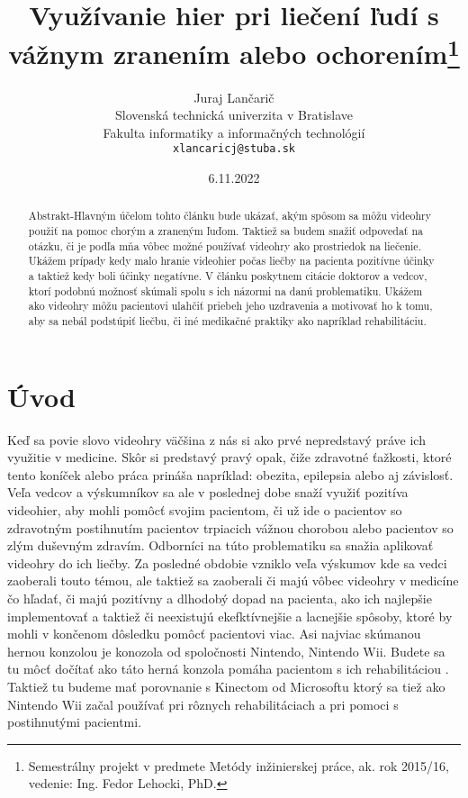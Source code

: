 \documentclass{article}
\title{Využívanie hier pri liečení ľudí s vážnym zranením
alebo ochorením\thanks{Semestrálny projekt v predmete Metódy inžinierskej práce, ak. rok 2015/16, vedenie: Ing. Fedor Lehocki, PhD.}} %
\author{Juraj Lančarič \\[2pt]
	{\small Slovenská technická univerzita v Bratislave}\\
	{\small Fakulta informatiky a informačných technológií}\\
	{\small \texttt{xlancaricj@stuba.sk}}
	}
\date{\small 6.11.2022} %
\begin{document}
\maketitle

\begin{abstract}
Abstrakt-Hlavným účelom tohto článku bude ukázať, akým spôsom sa môžu videohry použiť na pomoc chorým a zraneným ľuďom. Taktiež sa budem snažiť odpovedať na otázku, či je podľa mňa vôbec možné používať videohry ako prostriedok na liečenie. Ukážem prípady kedy malo hranie videohier počas liečby na pacienta pozitívne účinky a taktiež kedy boli účinky negatívne. V článku poskytnem citácie doktorov a vedcov, ktorí podobnú možnosť skúmali spolu s ich názormi na danú problematiku. Ukážem ako videohry môžu pacientovi ulahčiť priebeh jeho uzdravenia a motivovať ho k tomu, aby sa nebál podstúpiť liečbu, či iné medikačné praktiky ako napríklad rehabilitáciu.
\end{abstract}



\section{Úvod}
Keď sa povie slovo videohry väčšina z nás si ako prvé nepredstavý práve ich využitie v medicine. Skôr si predstavý pravý opak, čiže zdravotné ťažkosti, ktoré tento koníček alebo práca prináša napríklad: obezita, epilepsia alebo aj závislosť. Veľa vedcov a výskumníkov sa ale v poslednej dobe snaží využiť pozitíva videohier, aby mohli pomôcť svojim pacientom, či už ide o pacientov so zdravotným postihnutím pacientov trpiacich vážnou chorobou alebo pacientov so zlým duševným zdravím. Odborníci na túto problematiku sa snažia aplikovať videohry do ich liečby. 
Za posledné obdobie vzniklo veľa výskumov kde sa vedci zaoberali touto témou, ale taktiež sa zaoberali či majú vôbec videohry v medicíne čo hľadať, či majú pozitívny a dlhodobý dopad na pacienta, ako ich najlepšie implementovať a taktiež či neexistujú ekefktívnejšie a lacnejšie spôsoby, ktoré by mohli v končenom dôsledku pomôcť pacientovi viac.
Asi najviac skúmanou hernou konzolou je konozola od spoločnosti Nintendo, Nintendo Wii. Budete sa tu môcť dočítať ako táto herná konzola pomáha pacientom s ich rehabilitáciou \cite{Simas:Videogames}. 
Taktiež tu budeme mať porovnanie s Kinectom od Microsoftu \cite{Perez:Approach}ktorý sa tiež ako Nintendo Wii začal používať pri rôznych rehabilitáciach a pri pomoci s postihnutými pacientmi.

\end{document}
